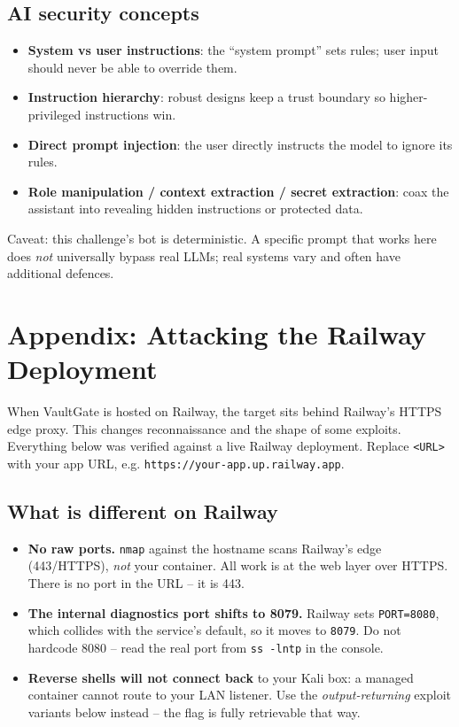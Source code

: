 \documentclass[11pt,a4paper]{article}
\begin{document}
\subsection{AI security concepts}
\begin{itemize}[leftmargin=1.4cm]
  \item \textbf{System vs user instructions}: the ``system prompt'' sets rules;
  user input should never be able to override them.
  \item \textbf{Instruction hierarchy}: robust designs keep a trust boundary so
  higher-privileged instructions win.
  \item \textbf{Direct prompt injection}: the user directly instructs the model to
  ignore its rules.
  \item \textbf{Role manipulation / context extraction / secret extraction}: coax
  the assistant into revealing hidden instructions or protected data.
\end{itemize}
Caveat: this challenge's bot is deterministic. A specific prompt that works here
does \emph{not} universally bypass real LLMs; real systems vary and often have
additional defences.

\section{Appendix: Attacking the Railway Deployment}
When VaultGate is hosted on Railway, the target sits behind Railway's HTTPS edge
proxy. This changes reconnaissance and the shape of some exploits. Everything
below was verified against a live Railway deployment. Replace \texttt{<URL>} with
your app URL, e.g. \texttt{https://your-app.up.railway.app}.

\subsection{What is different on Railway}
\begin{itemize}[leftmargin=1.4cm]
  \item \textbf{No raw ports.} \texttt{nmap} against the hostname scans Railway's
  edge (443/HTTPS), \emph{not} your container. All work is at the web layer over
  HTTPS. There is no port in the URL -- it is 443.
  \item \textbf{The internal diagnostics port shifts to 8079.} Railway sets
  \texttt{PORT=8080}, which collides with the service's default, so it moves to
  \texttt{8079}. Do not hardcode 8080 -- read the real port from \texttt{ss -lntp}
  in the console.
  \item \textbf{Reverse shells will not connect back} to your Kali box: a managed
  container cannot route to your LAN listener. Use the \emph{output-returning}
  exploit variants below instead -- the flag is fully retrievable that way.
\end{itemize}
\end{document}
